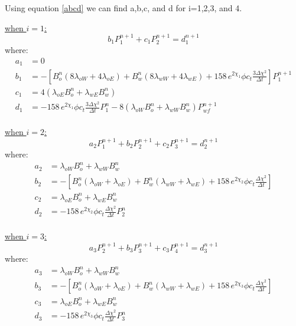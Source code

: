 \documentclass[12pt,letterpaper,titlepage]{article}
\begin{document}
Using equation \ref{abcd} we can find a,b,c, and d for i=1,2,3, and 4.

\underline{when $i=1$:}\\
\begin{equation*}
b_1 P^{n+1}_{1}+c_1 P^{n+1}_{2} =d^{n+1}_1
\end{equation*}
where: 
\begin{align*}
a_1&=0\\
b_1&=-\left[B_o^n(8\lambda_{oW}+4\lambda_{oE})+B_w^n(8\lambda_{wW}+4\lambda_{wE})+158\,e^{2\chi_1}\phi c_t \frac{3\Delta\chi^2}{\Delta t}\right]P_1^{n+1}\\
c_1&=4(\lambda_{oE}B_o^n+\lambda_{wE}B_w^n)\\
d_1&=-158\,e^{2\chi_1}\phi c_t \frac{3\Delta\chi^2}{\Delta t}P_1^n-8(\lambda_{oW}B_o^n+\lambda_{wW}B_w^n)P_{wf}^{n+1}\\
\end{align*}

\underline{when $i=2$:}
\begin{equation*}
a_2 P^{n+1}_{1}+b_2 P^{n+1}_{2}+c_2 P^{n+1}_{3} =d^{n+1}_2
\end{equation*}
where: 
\begin{align*}
a_2 &=\lambda_{oW}B_o^n+\lambda_{wW}B_w^n\\
b_2 &=-\left[B_o^n(\lambda_{oW}+\lambda_{oE})+B_w^n(\lambda_{wW}+\lambda_{wE})+158\,e^{2\chi_2}\phi c_t \frac{\Delta\chi^2}{\Delta t}\right]\\
c_2 &=\lambda_{oE}B_o^n+\lambda_{wE}B_w^n\\
d_2 &=-158\,e^{2\chi_2}\phi c_t \frac{\Delta\chi^2}{\Delta t}P_2^n\\
\end{align*}

\underline{when $i=3$:}
\begin{equation*}
a_3 P^{n+1}_{2}+b_3 P^{n+1}_{3}+c_3 P^{n+1}_{4} =d^{n+1}_3
\end{equation*}
where: 
\begin{align*}
a_3 &=\lambda_{oW}B_o^n+\lambda_{wW}B_w^n\\
b_3 &=-\left[B_o^n(\lambda_{oW}+\lambda_{oE})+B_w^n(\lambda_{wW}+\lambda_{wE})+158\,e^{2\chi_3}\phi c_t \frac{\Delta\chi^2}{\Delta t}\right]\\
c_3 &=\lambda_{oE}B_o^n+\lambda_{wE}B_w^n\\
d_3 &=-158\,e^{2\chi_3}\phi c_t \frac{\Delta\chi^2}{\Delta t}P_3^n\\
\end{align*}
\end{document}
